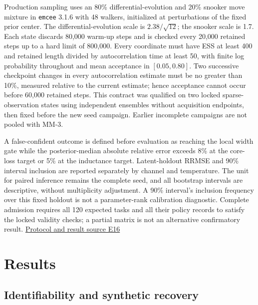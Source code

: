 Production sampling uses an 80\% differential-evolution and 20\% snooker
move mixture in \texttt{emcee} 3.1.6 with 48 walkers, initialized at
perturbations of the fixed prior center. The differential-evolution
scale is \(2.38/\sqrt{12}\); the snooker scale is 1.7. Each state
discards 80,000 warm-up steps and is checked every 20,000 retained steps
up to a hard limit of 800,000. Every coordinate must have ESS at least
400 and retained length divided by autocorrelation time at least 50,
with finite log probability throughout and mean acceptance in
\([0.05,0.80]\). Two successive checkpoint changes in every
autocorrelation estimate must be no greater than 10\%, measured relative
to the current estimate; hence acceptance cannot occur before 60,000
retained steps. This contract was qualified on two locked
sparse-observation states using independent ensembles without
acquisition endpoints, then fixed before the new seed campaign. Earlier
incomplete campaigns are not pooled with MM-3.

A false-confident outcome is defined before evaluation as reaching the
local width gate while the posterior-median absolute relative error
exceeds 8\% at the core-loss target or 5\% at the inductance target.
Latent-holdout RRMSE and 90\% interval inclusion are reported separately
by channel and temperature. The unit for paired inference remains the
complete seed, and all bootstrap intervals are descriptive, without
multiplicity adjustment. A 90\% interval's inclusion frequency over this
fixed holdout is not a parameter-rank calibration diagnostic. Complete
admission requires all 120 expected tasks and all their policy records
to satisfy the locked validity checks; a partial matrix is not an
alternative confirmatory result.
\href{https://github.com/hoangduong6210/EIG-bayesian-for-Recover-potential-Physical-Parameter-of-MagComponent/blob/a3e6326621d90123e5661c17e2d562fb0f5e0a41/wiki/evidence/Evidence-Sources.md\#e16}{Protocol
and result source E16}

\hypertarget{results}{%
\section{Results}\label{results}}

\hypertarget{identifiability-and-synthetic-recovery}{%
\subsection{Identifiability and synthetic
recovery}\label{identifiability-and-synthetic-recovery}}

